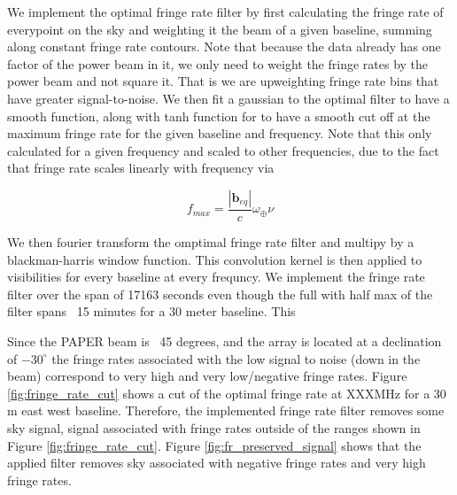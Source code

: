 \documentclass[twocolumn,numberedappendix]{emulateapj}
\begin{document}
We implement the optimal fringe rate filter by first calculating the fringe rate
of everypoint on the sky and weighting it the beam of a given baseline, summing
along constant fringe rate contours. Note that because the data already has one
factor of the power beam in it, we only need to weight the fringe rates by the
power beam and not square it. That is we are upweighting fringe rate bins that
have greater signal-to-noise.  We then fit a gaussian to the optimal filter to
have a smooth function, along with tanh function for to have a smooth cut off
at the maximum fringe rate for the given baseline and frequency.  Note that
this only calculated for a given frequency and scaled to other frequencies, due
to the fact that fringe rate scales linearly with frequency via

\begin{equation}
    f_{max} = \frac{|\mathbf{b}_{eq}|}{c}\omega_{\oplus}\nu
\end{equation}


We then fourier transform the omptimal fringe rate filter and multipy by a
blackman-harris window function. This convolution kernel is then applied to 
visibilities for every baseline at every frequncy. We implement the fringe rate
filter over the span of 17163 seconds even though the full with half max of the
filter spans ~15 minutes for a 30 meter baseline. This 

Since the PAPER beam is ~45 degrees, and the array is located at a declination
of $-30^{\circ}$ the fringe rates associated with the low signal to noise (down
in the beam) correspond to very high and very low/negative fringe rates. Figure
\ref{fig:fringe_rate_cut} shows a cut of the optimal fringe rate at XXXMHz for a 30
m east west baseline. Therefore, the implemented fringe rate filter removes some
sky signal, signal associated with fringe rates outside of the ranges shown in
Figure \ref{fig:fringe_rate_cut}. Figure \ref{fig:fr_preserved_signal} shows
that the applied filter removes sky associated with negative fringe rates and
very high fringe rates. 
\end{document}
